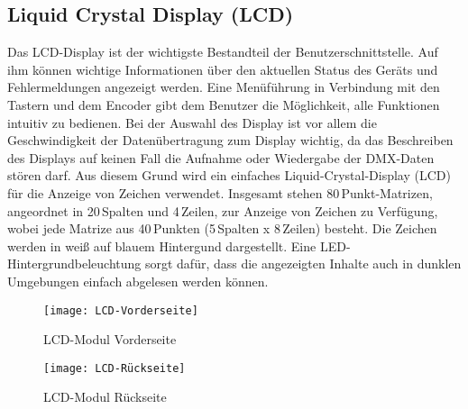 
\subsection{Liquid Crystal Display (LCD)}
\label{sec:HardLCD}
Das LCD-Display ist der wichtigste Bestandteil der Benutzerschnittstelle. Auf ihm können wichtige Informationen über den aktuellen Status des Geräts und Fehlermeldungen angezeigt werden. Eine Menüführung in Verbindung mit den Tastern und dem Encoder gibt dem Benutzer die Möglichkeit, alle Funktionen intuitiv zu bedienen. Bei der Auswahl des Display ist vor allem die Geschwindigkeit der Datenübertragung zum Display wichtig, da das Beschreiben des Displays auf keinen Fall die Aufnahme oder Wiedergabe der DMX-Daten stören darf. Aus diesem Grund wird ein einfaches Liquid-Crystal-Display (LCD) für die Anzeige von Zeichen verwendet. Insgesamt stehen 80\,Punkt-Matrizen, angeordnet in 20\,Spalten und 4\,Zeilen, zur Anzeige von Zeichen zu Verfügung, wobei jede Matrize aus 40\,Punkten (5\,Spalten x 8\,Zeilen) besteht. Die Zeichen werden in weiß auf blauem Hintergund dargestellt. Eine LED-Hintergrundbeleuchtung sorgt dafür, dass die angezeigten Inhalte auch in dunklen Umgebungen einfach abgelesen werden können.
\begin{figure}[h]
	\begin{minipage}{.45\linewidth}
		\centering
		\texttt{[image: LCD-Vorderseite]}
		\caption{LCD-Modul Vorderseite}
		\label{fig:LCD-front}
	\end{minipage}
	\hfill
	\begin{minipage}{.45\linewidth}
		\centering
		\texttt{[image: LCD-Rückseite]}
		\caption{LCD-Modul Rückseite}
		\label{fig:LCD-back}
	\end{minipage}
\end{figure}
